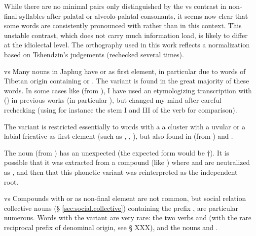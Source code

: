 While there are no minimal pairs only distinguished by the  vs  contrast in non-final syllables after palatal or alveolo-palatal consonants, it seems now clear that some words are consistently pronounced with  rather than  in this context. This unstable contrast, which does not carry much information load, is likely to differ at the idiolectal level. The orthography used in this work reflects a normalization based on Tshendzin's judgements (rechecked several times).
\begin{paragraph}{ vs }
Many nouns in Japhug have  or  as first element, in particular due to words of Tibetan origin containing  or . The variant   is found in the great majority of these words. In some cases like  (from ), I have used an etymologizing transcription with  () in previous works (in particular \citealt{jacques15japhug}), but changed my mind after careful rechecking (using for instance the stem I and III of the verb  for comparison). 

The variant  is restricted essentially to words with a a cluster with a uvular or a labial fricative as first element (such as , , ), but also found in  (from ) and .

The noun  (from ) has an unexpected  (the expected form would be $\dagger$). It is possible that it was extracted from a compound (like ) where  and  are neutralized as , and then that this phonetic variant was reinterpreted as the independent root.
\end{paragraph}
\begin{paragraph}{ vs  }
Compounds with  or  as non-final element are not common, but social relation collective nouns (§ \ref{sec:social.collective}) containing the prefix , are particular numerous. Words with the variant  are very rare: the two verbs  and  (with the rare reciprocal prefix  of denominal origin, see § XXX), and the nouns  and .
\end{paragraph}

